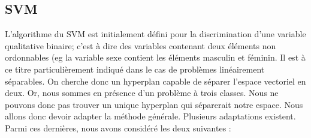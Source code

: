 \documentclass[a4paper]{report}
\begin{document}
\subsection{SVM}

L'algorithme du SVM est initialement défini pour la discrimination d'une variable qualitative binaire; c'est à dire des variables contenant deux éléments non ordonnables (eg la variable sexe contient les éléments masculin et féminin. Il est à ce titre particulièrement indiqué dans le cas de problèmes linéairement séparables. On cherche donc un hyperplan capable de séparer l'espace vectoriel en deux. Or, nous sommes en présence d'un problème à trois classes. Nous ne pouvons donc pas trouver un unique hyperplan qui séparerait notre espace. Nous allons donc devoir adapter la méthode générale. Plusieurs adaptations existent. Parmi ces dernières, nous avons considéré les deux suivantes :
\end{document}
